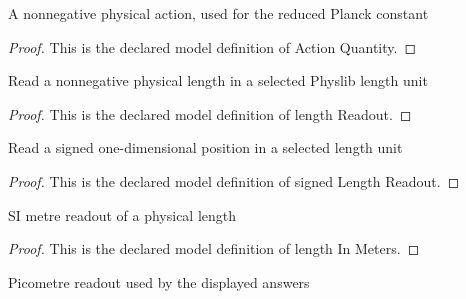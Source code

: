 \begin{definition}
  \label{def:physics:phyx-mini-0535:phyxminiproblems-problemphyxmini0535-actionquantity}
  A nonnegative physical action, used for the reduced Planck constant
\end{definition}
\begin{proof}
  This is the declared model definition of Action Quantity.
\end{proof}
\begin{definition}
  \label{def:physics:phyx-mini-0535:phyxminiproblems-problemphyxmini0535-lengthreadout}
  Read a nonnegative physical length in a selected Physlib length unit
\end{definition}
\begin{proof}
  This is the declared model definition of length Readout.
\end{proof}
\begin{definition}
  \label{def:physics:phyx-mini-0535:phyxminiproblems-problemphyxmini0535-signedlengthreadout}
  Read a signed one-dimensional position in a selected length unit
\end{definition}
\begin{proof}
  This is the declared model definition of signed Length Readout.
\end{proof}
\begin{definition}
  \label{def:physics:phyx-mini-0535:phyxminiproblems-problemphyxmini0535-lengthinmeters}
  SI metre readout of a physical length
\end{definition}
\begin{proof}
  This is the declared model definition of length In Meters.
\end{proof}
\begin{definition}
  \label{def:physics:phyx-mini-0535:phyxminiproblems-problemphyxmini0535-lengthinpicometers}
  Picometre readout used by the displayed answers
\end{definition}
